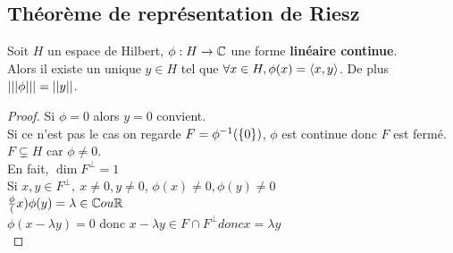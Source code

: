 \subsection{Théorème de représentation de Riesz}

\begin{theorem}
	Soit $H$ un espace de Hilbert, $\phi : H \to \mathbb{C}$ une forme \textbf{linéaire continue}.\\
	Alors il existe un unique $y \in H$ tel que $\forall x \in H, \phi(x) = \left\langle x, y \right\rangle$.
	De plus $\left|\left|\left|\phi\right|\right|\right| = \left|\left|y\right|\right|$.
\end{theorem}


\begin{proof}
	Si $\phi = 0$ alors $y = 0$ convient.\\
	Si ce n'est pas le cas on regarde $F = \phi^{-1}(\left\{0\right\})$, $\phi$ est continue donc $F$ est fermé.\\
	$F \subsetneq H$ car $\phi \neq 0$.\\
	En fait, $\dim F^\perp = 1$\\
	Si $x,y \in F^\perp,\ x \neq 0, y \neq 0$, 	$\phi(x) \neq 0, \phi(y) \neq 0$\\
	$\frac \phi(x) \phi(y) = \lambda \in \mathbb{C} ou  \mathbb{R}$\\
	$\phi(x-\lambda y) = 0$ donc $x - \lambda y \in F \cap F^\perp donc x = \lambda y$\\
\end{proof}



